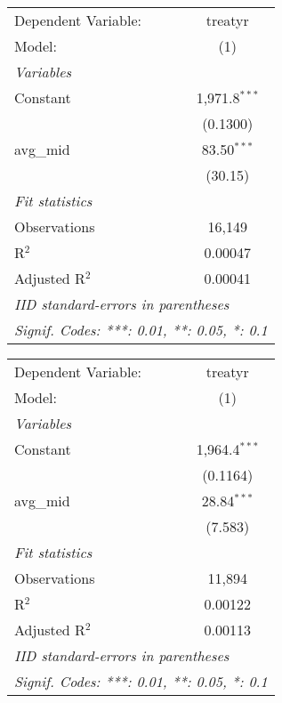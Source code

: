 \begingroup
\centering
\begin{tabular}{lc}
   \tabularnewline \midrule \midrule
   Dependent Variable: & treatyr\\  
   Model:              & (1)\\  
   \midrule
   \emph{Variables}\\
   Constant            & 1,971.8$^{***}$\\   
                       & (0.1300)\\   
   avg\_mid            & 83.50$^{***}$\\   
                       & (30.15)\\   
   \midrule
   \emph{Fit statistics}\\
   Observations        & 16,149\\  
   R$^2$               & 0.00047\\  
   Adjusted R$^2$      & 0.00041\\  
   \midrule \midrule
   \multicolumn{2}{l}{\emph{IID standard-errors in parentheses}}\\
   \multicolumn{2}{l}{\emph{Signif. Codes: ***: 0.01, **: 0.05, *: 0.1}}\\
\end{tabular}
\par\endgroup



\begingroup
\centering
\begin{tabular}{lc}
   \tabularnewline \midrule \midrule
   Dependent Variable: & treatyr\\  
   Model:              & (1)\\  
   \midrule
   \emph{Variables}\\
   Constant            & 1,964.4$^{***}$\\   
                       & (0.1164)\\   
   avg\_mid            & 28.84$^{***}$\\   
                       & (7.583)\\   
   \midrule
   \emph{Fit statistics}\\
   Observations        & 11,894\\  
   R$^2$               & 0.00122\\  
   Adjusted R$^2$      & 0.00113\\  
   \midrule \midrule
   \multicolumn{2}{l}{\emph{IID standard-errors in parentheses}}\\
   \multicolumn{2}{l}{\emph{Signif. Codes: ***: 0.01, **: 0.05, *: 0.1}}\\
\end{tabular}
\par\endgroup



